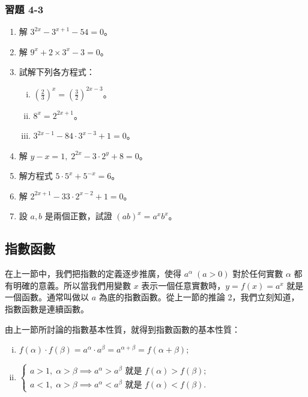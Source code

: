 \subsubsection*{習題 4-3}

\begin{enumerate}
    \item 解 $3^{2x} - 3^{x+1} - 54 = 0$。
    \item 解 $9^x + 2\times 3^x - 3 = 0$。
    \item 試解下列各方程式：
    \begin{enumerate}[(i)]
        \item $\left(\frac{2}{3}\right)^x = \left(\frac{3}{2}\right)^{2x-3}$。
        \item $8^x = 2^{2x+1}$。
        \item $3^{2x-1} - 84\cdot 3^{x-3} + 1 = 0$。
    \end{enumerate}
    \item 解 $y-x=1,\; 2^{2x} - 3\cdot 2^y + 8 = 0$。
    \item 解方程式 $5\cdot 5^x + 5^{-x} = 6$。
    \item 解 $2^{2x+1} - 33\cdot 2^{x-2} + 1 = 0$。
    \item 設 $a, b$ 是兩個正數，試證 $(ab)^x = a^x b^x$。
\end{enumerate}

\subsection{指數函數}\label{sec:b2_4-2}

在上一節中，我們把指數的定義逐步推廣，使得 $a^\alpha\; (a>0)$ 對於任何實數 $\alpha$ 都有明確的意義。所以當我們用變數 $x$ 表示一個任意實數時，$y = f(x) = a^x$ 就是一個函數。通常叫做以 $a$ 為底的指數函數。從上一節的推論 2，我們立刻知道，指數函數是連續函數。

由上一節所討論的指數基本性質，就得到指數函數的基本性質：
\begin{enumerate}[(i)]
    \item $f(\alpha)\cdot f(\beta) = a^\alpha \cdot a^\beta = a^{\alpha+\beta} = f(\alpha+\beta)$;
    \item $\begin{cases} a > 1,\; \alpha > \beta \implies a^\alpha > a^\beta \text{ 就是 } f(\alpha) > f(\beta); \\ a < 1,\; \alpha > \beta \implies a^\alpha < a^\beta \text{ 就是 } f(\alpha) < f(\beta). \end{cases}$
\end{enumerate}

